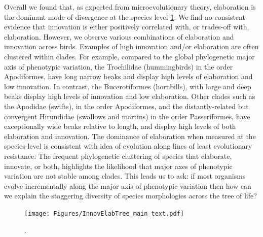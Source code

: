 \documentclass[12pt,letterpaper]{article}
\begin{document}
Overall we found that, as expected from microevolutionary theory, elaboration is the dominant mode of divergence at the species level \ref{Fig:phylogeny}.
We find no consistent evidence that innovation is either positively correlated with, or trades-off with, elaboration. %
However, we observe various combinations of elaboration and innovation across birds.
Examples of high innovation and/or elaboration are often clustered within clades.
For example, compared to the global phylogenetic major axis of phenotypic variation, the Trochilidae (hummingbirds) in the order Apodiformes, have long narrow beaks and display high levels of elaboration and low innovation.
In contrast, the Bucerotiformes (hornbills), with large and deep beaks display high levels of innovation and low elaboration.
Other clades such as the Apodidae (swifts), in the order Apodiformes, and the distantly-related but convergent Hirundidae (swallows and martins) in the order Passeriformes, have exceptionally wide beaks relative to length, and display high levels of both elaboration and innovation.
The dominance of elaboration when measured at the species-level is consistent with idea of evolution along lines of least evolutionary resistance.
The frequent phylogenetic clustering of species that elaborate, innovate, or both, highlights the likelihood that major axes of phenotypic variation are not stable among clades.
This leads us to ask: if most organisms evolve incrementally along the major axis of phenotypic variation then how can we explain the staggering diversity of species morphologies across the tree of life? 

\begin{figure}[!htbp]
\centering
    \texttt{[image: Figures/InnovElabTree\_main\_text.pdf]}
\caption{.}
\label{Fig:phylogeny}
\end{figure}


\bigskip
\end{document}
